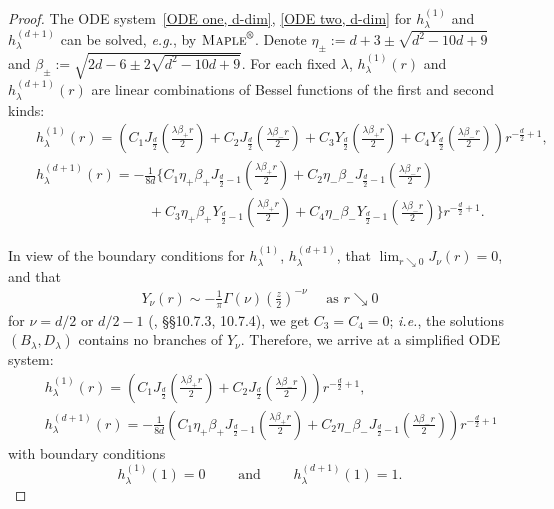 \documentclass[11pt,a4paper,english,reqno]{amsart}
\theoremstyle{plain}
\newcommand{\G}{\Gamma}
\newcommand{\1}{\mathbbm{1}}
\begin{document}
\begin{proof}
The ODE system~\eqref{ODE one, d-dim}, \eqref{ODE two, d-dim} for $h^{(1)}_{\lambda}$ and $h^{(d+1)}_{\lambda}$ can be solved, \emph{e.g.}, by $\textsc{Maple}^\text{\textregistered}$.    Denote $\eta_\pm:= d+3 \pm \sqrt{d^2-10d+9}$ and $\beta_\pm:=\sqrt{2d-6 \pm 2 \sqrt{d^2-10d+9}}$. For each fixed $\lambda$, $h^{(1)}_{\lambda}(r)$ and $h^{(d+1)}_{\lambda}(r)$ are linear combinations of Bessel functions of the first and second kinds:
\begin{eqnarray}
&&h^{(1)}_\lambda(r) = \left(C_{1} J_{\frac{d}{2}}\left( \frac{\lambda  \beta_+ r}{2}\right) +  C_{2}J_{\frac{d}{2}}\left( \frac{\lambda \beta_- r}{2}\right)+ C_{3} Y_{\frac{d}{2}}\left( \frac{\lambda  \beta_+ r}{2}\right) +  C_{4}Y_{\frac{d}{2}}\left( \frac{\lambda \beta_- r}{2}\right)\right) r^{-\frac{d}{2}+1},\label{new-a}\\
&&h^{(d+1)}_\lambda(r) = - \frac{1}{8d}\Bigg\{C_1 \eta_+ \beta_+  J_{\frac{d}{2}-1} \left( \frac{\lambda \beta_+ r}{2}\right) + C_2 \eta_-\beta_-  J_{\frac{d}{2}-1}\left( \frac{\lambda \beta_- r}{2}\right)\nonumber\\
&&\qquad\qquad\qquad\qquad+C_3\eta_+\beta_+  Y_{\frac{d}{2}-1} \left( \frac{\lambda \beta_+ r}{2}\right) + C_4 \eta_-\beta_-  Y_{\frac{d}{2}-1}\left( \frac{\lambda \beta_- r}{2}\right)\Bigg\}r^{-\frac{d}{2}+1}. \label{new-b}
\end{eqnarray}

In view of the boundary conditions for $h^{(1)}_\lambda$, $h^{(d+1)}_\lambda$, that $\lim_{r \searrow 0}J_\nu(r)=0$,  and that 
\begin{align*}
Y_\nu(r) \sim -\frac{1}{\pi} \G(\nu) \left(\frac{z}{2}\right)^{-\nu}\quad\text{ as } r \searrow 0
\end{align*}
for $\nu = d/2$ or $d/2-1$ (\cite{lozier2003nist}, \S\S 10.7.3, 10.7.4), we get $C_3=C_4=0$; \emph{i.e.}, the solutions $(B_\lambda, D_\lambda)$ contains no branches of $Y_\nu$. Therefore, we arrive at a simplified ODE system:
\begin{eqnarray}
&&h^{(1)}_\lambda(r) = \left(C_{1} J_{\frac{d}{2}}\left( \frac{\lambda  \beta_+ r}{2}\right) +  C_{2}J_{\frac{d}{2}}\left( \frac{\lambda \beta_- r}{2}\right)\right) r^{-\frac{d}{2}+1},\label{eqn:d_ball_A}\\
&&h^{(d+1)}_\lambda(r) = - \frac{1}{8d}\left(C_1 \eta_+ \beta_+  J_{\frac{d}{2}-1} \left( \frac{\lambda \beta_+ r}{2}\right) + C_2 \eta_-\beta_-  J_{\frac{d}{2}-1}\left( \frac{\lambda \beta_- r}{2}\right)\right)r^{-\frac{d}{2} +1} \label{eqn:d_ball_C}
\end{eqnarray}
with boundary conditions
\begin{equation}\label{bc, arb dim, B and D}
h^{(1)}_\lambda(1) = 0\qquad \text{ and }\qquad h^{(d+1)}_\lambda(1)=1.
\end{equation}




\end{proof}
\end{document}
